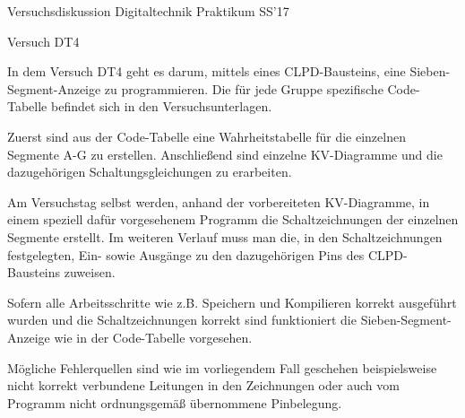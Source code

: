 Versuchsdiskussion Digitaltechnik Praktikum SS'17

Versuch DT4

In dem Versuch DT4 geht es darum, mittels eines CLPD-Bausteins, eine Sieben-Segment-Anzeige zu programmieren.
Die für jede Gruppe spezifische Code-Tabelle befindet sich in den Versuchsunterlagen. 

Zuerst sind aus der Code-Tabelle eine Wahrheitstabelle für die einzelnen Segmente A-G zu erstellen.
Anschließend sind einzelne KV-Diagramme und die dazugehörigen Schaltungsgleichungen zu erarbeiten.

Am Versuchstag selbst werden, anhand der vorbereiteten KV-Diagramme, in einem speziell dafür vorgesehenem Programm die Schaltzeichnungen der einzelnen Segmente erstellt. Im weiteren Verlauf muss man die, in den Schaltzeichnungen festgelegten, Ein- sowie Ausgänge zu den dazugehörigen Pins des CLPD-Bausteins zuweisen.

Sofern alle Arbeitsschritte wie z.B. Speichern und Kompilieren korrekt ausgeführt wurden und die Schaltzeichnungen korrekt sind funktioniert die Sieben-Segment-Anzeige wie in der Code-Tabelle vorgesehen.

Mögliche Fehlerquellen sind wie im vorliegendem Fall geschehen beispielsweise nicht korrekt verbundene Leitungen in den Zeichnungen oder auch vom Programm nicht ordnungsgemäß übernommene Pinbelegung.
